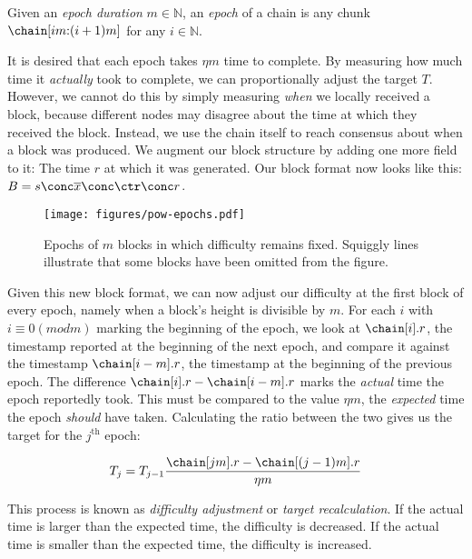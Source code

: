 \begin{definition}[Epoch]
  Given an \emph{epoch duration} $m \in \mathbb{N}$,
  an \emph{epoch} of a chain is any chunk $\chain[im{:}(i + 1)m]$
  for any $i \in \mathbb{N}$.
\end{definition}

It is desired that each epoch takes $\eta m$ time to complete.
By measuring how much time it \emph{actually} took to complete,
we can proportionally adjust the target $T$. However, we cannot
do this by simply measuring \emph{when} we locally received a block,
because different nodes may disagree about the time at which
they received the block. Instead, we use the chain itself to
reach consensus about when a block was produced. We augment
our block structure by adding one more field to it: The time $r$
at which it was generated. Our block format now looks like
this: $B = s \conc \overline{x} \conc \ctr \conc r$.

\begin{figure}[h]
  \centering
  \texttt{[image: figures/pow-epochs.pdf]}
  \caption{Epochs of $m$ blocks in which difficulty remains fixed. Squiggly lines
           illustrate that some blocks have been omitted from the figure.}
  \label{fig.pow-epochs}
\end{figure}

Given this new block format, we can now adjust our difficulty at
the first block of every epoch, namely when a block's height is
divisible by $m$. For each $i$ with $i \equiv 0 (mod m)$ marking
the beginning of the epoch, we look at $\chain[i].r$, the timestamp
reported at the beginning of the next epoch, and compare it against
the timestamp $\chain[i - m].r$, the timestamp at the beginning
of the previous epoch. The difference $\chain[i].r - \chain[i - m].r$
marks the \emph{actual} time the epoch reportedly took. This must
be compared to the value $\eta m$, the \emph{expected} time
the epoch \emph{should}
have taken. Calculating the ratio between the two gives us the
target for the $j^\text{th}$ epoch:

\[
    T_j = T_{j - 1} \frac{\chain[jm].r - \chain[(j - 1)m].r}{\eta m}
\]

This process is known as \emph{difficulty adjustment} or \emph{target
recalculation}. If the actual time is larger than the expected time,
the difficulty is decreased. If the actual time is smaller than the
expected time, the difficulty is increased.

